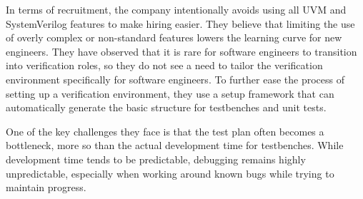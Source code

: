 \documentclass[12pt]{book}
\begin{document}
In terms of recruitment, the company intentionally avoids using all UVM and SystemVerilog features to make hiring
easier. They believe that limiting the use of overly complex or non-standard features lowers the learning curve for
new engineers. They have observed that it is rare for software engineers to transition into verification roles, so
they do not see a need to tailor the verification environment specifically for software engineers. To further ease
the process of setting up a verification environment, they use a setup framework that can automatically generate the
basic structure for testbenches and unit tests.

One of the key challenges they face is that the test plan often becomes a bottleneck, more so than the actual
development time for testbenches. While development time tends to be predictable, debugging remains highly
unpredictable, especially when working around known bugs while trying to maintain progress.
\end{document}
